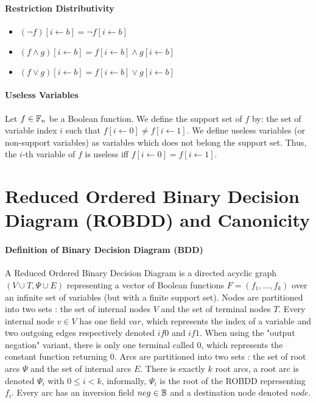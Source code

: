 \documentclass[a4paper,10pt]{article}
\begin{document}
\paragraph{Restriction Distributivity\\}

\begin{itemize}
\item $(\lnot f)[i\leftarrow b] = \lnot f[i\leftarrow b]$
\item $(f\land g)[i\leftarrow b] = f[i\leftarrow b] \land g[i\leftarrow b]$
\item $(f\lor g)[i\leftarrow b] = f[i\leftarrow b] \lor g[i\leftarrow b]$
\end{itemize}

\paragraph{Useless Variables\\}

Let $f\in\mathbb{F}_n$ be a Boolean function.
We define the support set of $f$ by: the set of variable index $i$ such that $f[i\leftarrow 0] \neq f[i\leftarrow 1]$.
We define useless variables (or non-support variables) as variables which does not belong the support set.
Thus, the $i$-th variable of $f$ is useless iff $f[i\leftarrow 0] = f[i\leftarrow 1]$.

\section{Reduced Ordered Binary Decision Diagram (ROBDD) and Canonicity}

\paragraph{Definition of Binary Decision Diagram (BDD)\\}

A Reduced Ordered Binary Decision Diagram is a directed acyclic graph $(V\cup T, \Psi \cup E)$ representing a vector of Boolean functions $F=(f_1, ..., f_k)$ over an infinite set of variables (but with a finite support set).
Nodes are partitioned into two sets : the set of internal nodes $V$ and the set of terminal nodes $T$.
Every internal node $v\in V$ has one field $var$, which represents the index of a variable and two outgoing edges respectively denoted $if0$ and $if1$.
When using the "output negation" variant, there is only one terminal called 0, which represents the constant function returning 0.
Arcs are partitioned into two sets : the set of root arcs $\Psi$ and the set of internal arcs $E$.
There is exactly $k$ root arcs, a root arc is denoted $\Psi_i$ with $0\leq i < k$, informally, $\Psi_i$ is the root of the ROBDD representing $f_i$.
Every arc has an inversion field $neg \in \mathbb{B}$ and a destination node denoted $node$.
\end{document}
